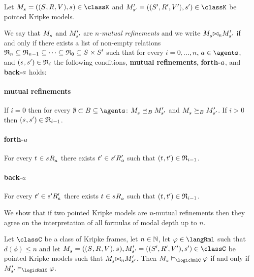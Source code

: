 \begin{definition}
Let $\kPModelAndTuple{\kStateS} \in \classK$ and $\kPModelAndTupleP{\kStateSP} \in \classK$ be pointed Kripke models.

We say that $\kPModel{\kStateS}$ and ${M^{\prime}_{{s}^{\prime}}}$ are {\em $n$-mutual refinements} and we write $\kPModel{\kStateS} \bisimref[n] \kPModelP{\kStateSP}$ if and only if there exists a list of non-empty relations $\refinement_n \subseteq \refinement_{n - 1} \subseteq \cdots \subseteq \refinement_0 \subseteq \kStates \times \kStatesP$ such that for every $i = 0, \dots, n$, $\agentA \in \agents$, and $(\kStateS, \kStateSP) \in \refinement_i$ the following conditions, {\bf mutual refinements}, {\bf forth-$a$}, and {\bf back-$a$} holds: 

\paragraph{mutual refinements} 
If $i = 0$ then for every $\emptyset \subset \agentsB \subseteq \agents$: $\kPModel{\kStateS} \refinesBs \kPModelP{\kStateSP}$ and $\kPModel{\kStateS} \simulatesBs \kPModelP{\kStateSP}$.
If $i > 0$ then $(\kStateS, \kStateSP) \in \refinement_{i - 1}$.

\paragraph{forth-$a$}
For every $\kStateT \in \kStateS \kAccessibility{\agentA}$ there exists ${t}^{\prime} \in {s}^{\prime} {R^{\prime}_{a}}$ such that $(\kStateT, \kStateTP) \in \refinement_{i - 1}$.

\paragraph{back-$a$}
For every ${t}^{\prime} \in {s}^{\prime} {R^{\prime}_{a}}$ there exists $\kStateT \in \kStateS \kAccessibility{\agentA}$ such that $(\kStateT, \kStateTP) \in \refinement_{i - 1}$.
\end{definition}

We show that if two pointed Kripke models are $n$-mutual refinements then they agree on the interpretation of all \langRml{} formulas of modal depth up to $n$.

\begin{lemma}
Let $\classC$ be a class of Kripke frames,
let $n \in \mathbb{N}$,
let $\phi \in \langRml$ such that $d(\phi) \leq n$
and let $\kPModelAndTuple{\kStateS}, \kPModelAndTupleP{\kStateSP} \in \classC$ be pointed Kripke models
such that $\kPModel{\kStateS} \bisimref[n] \kPModelP{\kStateSP}$.
Then $\kPModel{\kStateS} \entails_\logicRmlC \phi$ if and only if $\kPModelP{\kStateSP} \entails_\logicRmlC \phi$.
\end{lemma}

